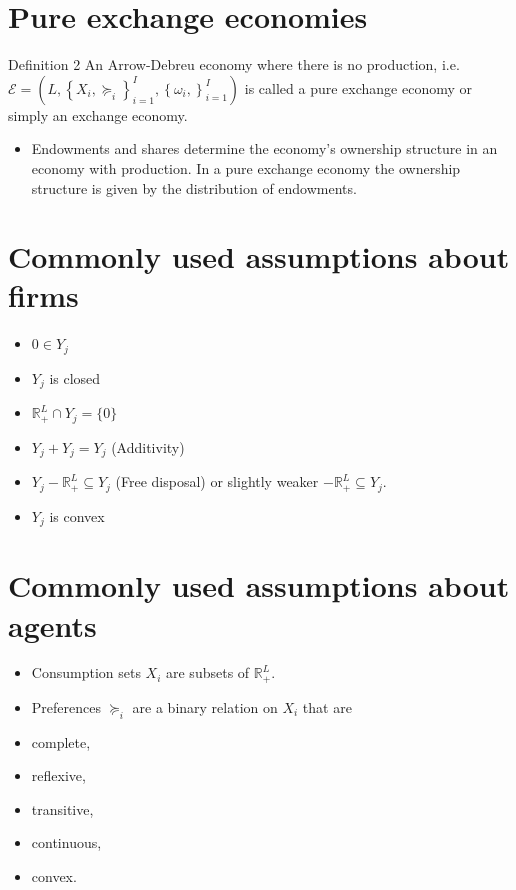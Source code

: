 \documentclass[10pt]{article}
\begin{document}
\section*{Pure exchange economies}
Definition 2 An Arrow-Debreu economy where there is no production, i.e. $\mathcal{E} =\left(L,\left\{X_{i}, \succeq_{i}\right\}_{i=1}^{I},\left\{\omega_{i},\right\}_{i=1}^{I}\right)$ is called a pure exchange economy or simply an exchange economy.

\begin{itemize}
  \item Endowments and shares determine the economy's ownership structure in an economy with production. In a pure exchange economy the ownership structure is given by the distribution of endowments.
\end{itemize}

\section*{Commonly used assumptions about firms}
\begin{itemize}
  \item $0 \in Y_{j}$
  \item $Y_{j}$ is closed
  \item $\mathbb{R}_{+}^{L} \cap Y_{j}=\{0\}$
  \item $Y_{j}+Y_{j}=Y_{j}$ (Additivity)
  \item $Y_{j}-\mathbb{R}_{+}^{L} \subseteq Y_{j}$ (Free disposal) or slightly weaker $-\mathbb{R}_{+}^{L} \subseteq Y_{j}$.
  \item $Y_{j}$ is convex
\end{itemize}

\section*{Commonly used assumptions about agents}
\begin{itemize}
  \item Consumption sets $X_{i}$ are subsets of $\mathbb{R}_{+}^{L}$.
  \item Preferences $\succeq_{i}$ are a binary relation on $X_{i}$ that are
  \item complete,
  \item reflexive,
  \item transitive,
  \item continuous,
  \item convex.
\end{itemize}
\end{document}
